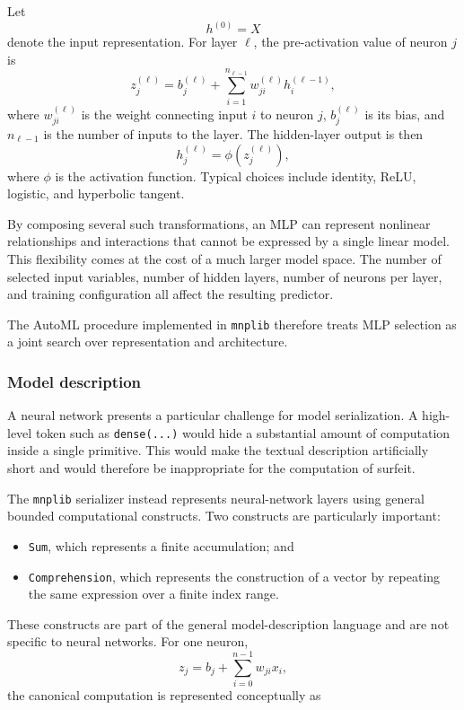 Let
\[
h^{(0)} = X
\]
denote the input representation. For layer \(\ell\), the pre-activation value of neuron $j$ is
\[
z_j^{(\ell)} = b_j^{(\ell)} + \sum_{i=1}^{n_{\ell-1}} w_{ji}^{(\ell)} h_i^{(\ell-1)},
\]
where $w_{ji}^{(\ell)}$ is the weight connecting input $i$ to neuron $j$, $b_j^{(\ell)}$ is its bias, and $n_{\ell-1}$ is the number of inputs to the layer. The hidden-layer output is then
\[
h_j^{(\ell)} = \phi\!\left(z_j^{(\ell)}\right),
\]
where $\phi$ is the activation function. Typical choices include identity, ReLU, logistic, and hyperbolic tangent.

By composing several such transformations, an MLP can represent nonlinear relationships and interactions that cannot be expressed by a single linear model. This flexibility comes at the cost of a much larger model space. The number of selected input variables, number of hidden layers, number of neurons per layer, and training configuration all affect the resulting predictor.

The AutoML procedure implemented in \texttt{mnplib} therefore treats MLP selection as a joint search over representation and architecture.


\subsubsection{Model description}

A neural network presents a particular challenge for model serialization. A high-level token such as \texttt{dense(...)} would hide a substantial amount of computation inside a single primitive. This would make the textual description artificially short and would therefore be inappropriate for the computation of surfeit.

The \texttt{mnplib} serializer instead represents neural-network layers using general bounded computational constructs. Two constructs are particularly important:

\begin{itemize}
    \item \texttt{Sum}, which represents a finite accumulation; and
    \item \texttt{Comprehension}, which represents the construction of a vector by repeating the same expression over a finite index range.
\end{itemize}

These constructs are part of the general model-description language and are not specific to neural networks. For one neuron,
\[
z_j = b_j + \sum_{i=0}^{n-1}w_{ji}x_i,
\]
the canonical computation is represented conceptually as

